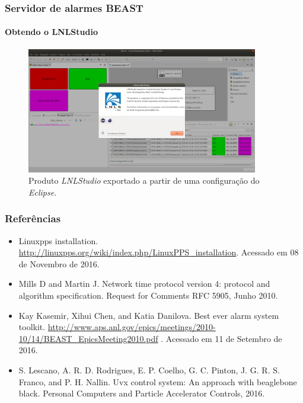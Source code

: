 \documentclass{beamer}
\begin{document}

\begin{frame}
\frametitle{Servidor de alarmes BEAST}
\framesubtitle{Obtendo o LNLStudio}
\begin{figure}[h]
\centering
\includegraphics[width=0.90\textwidth]{image/lnlstudio}
\caption {\centering Produto \textit{LNLStudio} exportado a partir de uma
configuração do \textit{Eclipse}.}
\label{fig:lnlstudio}
\end{figure}

\end{frame}

\begin{frame}
\frametitle{Referências}

{\small
\begin{itemize}
  \item Linuxpps installation. 
  \url{http://linuxpps.org/wiki/index.php/LinuxPPS_installation}. Acessado em 08 de Novembro de 2016.
  \item Mills D and Martin J. Network time protocol version 4: protocol and
  algorithm specification. Request for Comments RFC 5905, Junho 2010.
\item  Kay Kasemir, Xihui Chen, and Katia Danilova. Best ever alarm system
toolkit. \url{http://www.aps.anl.gov/epics/meetings/2010-10/14/BEAST_EpicsMeeting2010.pdf} . Acessado em 11 de Setembro de 2016.
\item S. Lescano, A. R. D. Rodrigues, E. P. Coelho, G. C. Pinton, J. G. R. S.
 Franco, and P. H. Nallin. Uvx control system: An approach with beaglebone
 black. Personal Computers and Particle Accelerator Controls, 2016.
\end{itemize}
}
\end{frame}
\end{document}
